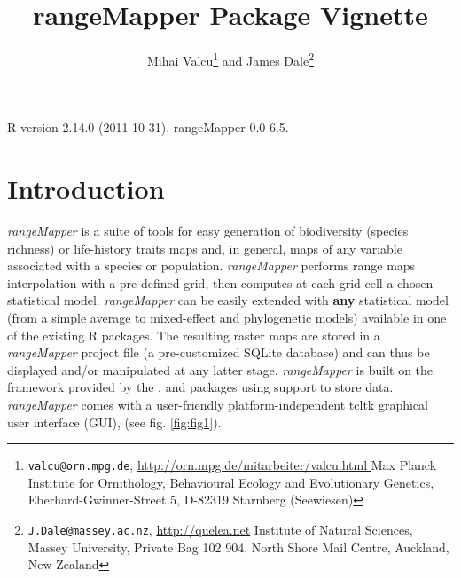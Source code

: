 \documentclass[ a4paper ]{article}
\begin{document}
\title{rangeMapper Package Vignette}
\author{
Mihai Valcu\footnote{
	\texttt{valcu@orn.mpg.de},
	\url{http://orn.mpg.de/mitarbeiter/valcu.html }
	Max Planck Institute for Ornithology, 
	Behavioural Ecology and Evolutionary Genetics, 
	Eberhard-Gwinner-Street 5, D-82319 Starnberg (Seewiesen)} and 
James Dale\footnote{
	\texttt{J.Dale@massey.ac.nz},
	\url{http://quelea.net}
	Institute of Natural Sciences,
	Massey University,
	Private Bag 102 904,
	North Shore Mail Centre,
	Auckland, New Zealand 
}
}

\maketitle
R version 2.14.0 (2011-10-31),
rangeMapper 0.0-6.5.


\section{Introduction}
	\emph{rangeMapper} is a suite of tools for easy generation of biodiversity (species richness) or life-history traits maps and, in general, maps of any variable associated with a species or population. 
	\emph{rangeMapper} performs range maps interpolation with a pre-defined grid, then computes at each grid cell a chosen statistical model. 
	\emph{rangeMapper} can be easily extended with {\bf any} statistical model (from a simple average to mixed-effect and phylogenetic models) available in one of the existing R packages.
	 The resulting raster maps are stored in a \emph{rangeMapper} project file (a pre-customized SQLite database) and 
	 can thus be displayed and/or manipulated at any latter stage.
	\emph{rangeMapper} is built on the framework provided by the \cite{sp}, \cite{maptools} and \cite{rgdal} packages using \cite{sqlite} support to store data.
	\emph{rangeMapper} comes with a user-friendly platform-independent tcltk graphical user interface (GUI), (see fig. \ref{fig:fig1}). 
\end{document}
